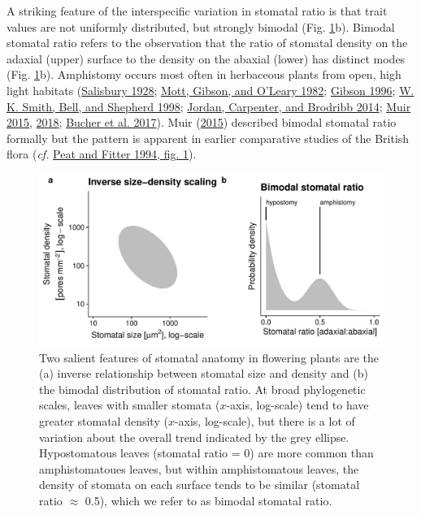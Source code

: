 \documentclass[
  12pt,
]{article}
\begin{document}
A striking feature of the interspecific variation in stomatal ratio is that trait values are not uniformly distributed, but strongly bimodal (Fig. \ref{fig:concepts}b). Bimodal stomatal ratio refers to the observation that the ratio of stomatal density on the adaxial (upper) surface to the density on the abaxial (lower) has distinct modes (Fig. \ref{fig:concepts}b). Amphistomy occurs most often in herbaceous plants from open, high light habitats (\protect\hyperlink{ref-salisbury_i_1928}{Salisbury 1928}; \protect\hyperlink{ref-mott_adaptive_1982}{Mott, Gibson, and O'Leary 1982}; \protect\hyperlink{ref-gibson_structure-function_1996}{Gibson 1996}; \protect\hyperlink{ref-smith_associations_1998}{W. K. Smith, Bell, and Shepherd 1998}; \protect\hyperlink{ref-jordan_using_2014}{Jordan, Carpenter, and Brodribb 2014}; \protect\hyperlink{ref-muir_making_2015}{Muir 2015}, \protect\hyperlink{ref-muir_light_2018}{2018}; \protect\hyperlink{ref-bucher_stomatal_2017}{Bucher et al. 2017}). Muir (\protect\hyperlink{ref-muir_making_2015}{2015}) described bimodal stomatal ratio formally but the pattern is apparent in earlier comparative studies of the British flora (\emph{cf.} \protect\hyperlink{ref-peat_comparative_1994}{Peat and Fitter 1994, fig. 1}).

\begin{figure}[ht]
\includegraphics[width=\textwidth]{../figures/concepts.pdf}
\caption{Two salient features of stomatal anatomy in flowering plants are the (a) inverse relationship between stomatal size and density and (b) the bimodal distribution of stomatal ratio. At broad phylogenetic scales, leaves with smaller stomata ($x$-axis, log-scale) tend to have greater stomatal density  ($x$-axis, log-scale), but there is a lot of variation about the overall trend indicated by the grey ellipse. Hypostomatous leaves (stomatal ratio = 0) are more common than amphistomatoues leaves, but within amphistomatous leaves, the density of stomata on each surface tends to be similar (stomatal ratio $\approx$ 0.5), which we refer to as bimodal stomatal ratio.}
\label{fig:concepts}
\end{figure}
\end{document}
